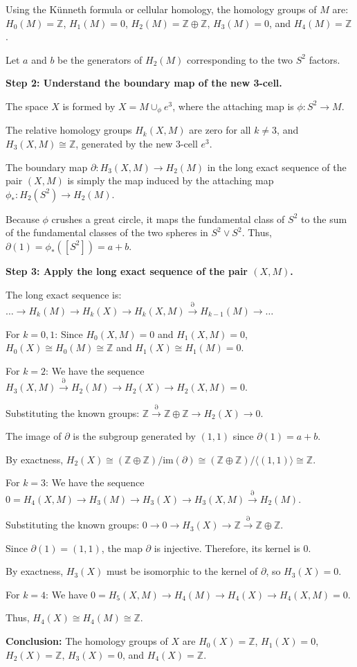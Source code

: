 \begin{solution}
Using the K\"unneth formula or cellular homology, the homology groups of $M$ are:
$H_0(M) = \mathbb{Z}$, $H_1(M) = 0$, $H_2(M) = \mathbb{Z} \oplus \mathbb{Z}$, $H_3(M) = 0$, and $H_4(M) = \mathbb{Z}$.

Let $a$ and $b$ be the generators of $H_2(M)$ corresponding to the two $S^2$ factors.

\textbf{Step 2: Understand the boundary map of the new 3-cell.}

The space $X$ is formed by $X = M \cup_\phi e^3$, where the attaching map is $\phi: S^2 \to M$. 

The relative homology groups $H_k(X, M)$ are zero for all $k \neq 3$, and $H_3(X, M) \cong \mathbb{Z}$, generated by the new 3-cell $e^3$.

The boundary map $\partial: H_3(X, M) \to H_2(M)$ in the long exact sequence of the pair $(X, M)$ is simply the map induced by the attaching map $\phi_*: H_2(S^2) \to H_2(M)$.

Because $\phi$ crushes a great circle, it maps the fundamental class of $S^2$ to the sum of the fundamental classes of the two spheres in $S^2 \vee S^2$. Thus, $\partial(1) = \phi_*([S^2]) = a + b$.

\textbf{Step 3: Apply the long exact sequence of the pair $(X, M)$.}

The long exact sequence is:
$\dots \to H_k(M) \to H_k(X) \to H_k(X, M) \xrightarrow{\partial} H_{k-1}(M) \to \dots$

For $k=0, 1$:
Since $H_0(X, M) = 0$ and $H_1(X, M) = 0$, $H_0(X) \cong H_0(M) \cong \mathbb{Z}$ and $H_1(X) \cong H_1(M) = 0$.

For $k=2$:
We have the sequence $H_3(X, M) \xrightarrow{\partial} H_2(M) \to H_2(X) \to H_2(X, M) = 0$.

Substituting the known groups: $\mathbb{Z} \xrightarrow{\partial} \mathbb{Z} \oplus \mathbb{Z} \to H_2(X) \to 0$.

The image of $\partial$ is the subgroup generated by $(1, 1)$ since $\partial(1) = a + b$. 

By exactness, $H_2(X) \cong (\mathbb{Z} \oplus \mathbb{Z}) / \text{im}(\partial) \cong (\mathbb{Z} \oplus \mathbb{Z}) / \langle (1, 1) \rangle \cong \mathbb{Z}$.

For $k=3$:
We have the sequence $0 = H_4(X, M) \to H_3(M) \to H_3(X) \to H_3(X, M) \xrightarrow{\partial} H_2(M)$.

Substituting the known groups: $0 \to 0 \to H_3(X) \to \mathbb{Z} \xrightarrow{\partial} \mathbb{Z} \oplus \mathbb{Z}$.

Since $\partial(1) = (1, 1)$, the map $\partial$ is injective. Therefore, its kernel is $0$.

By exactness, $H_3(X)$ must be isomorphic to the kernel of $\partial$, so $H_3(X) = 0$.

For $k=4$:
We have $0 = H_5(X, M) \to H_4(M) \to H_4(X) \to H_4(X, M) = 0$.

Thus, $H_4(X) \cong H_4(M) \cong \mathbb{Z}$.

\textbf{Conclusion:}
The homology groups of $X$ are $H_0(X) = \mathbb{Z}$, $H_1(X) = 0$, $H_2(X) = \mathbb{Z}$, $H_3(X) = 0$, and $H_4(X) = \mathbb{Z}$.
\end{solution}


